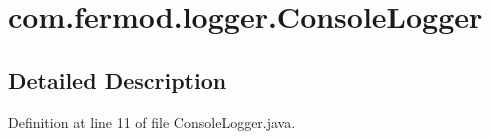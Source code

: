 \hypertarget{a00030}{}\section{com.\+fermod.\+logger.\+Console\+Logger}
\label{a00030}


\subsection{Detailed Description}


Definition at line 11 of file Console\+Logger.\+java.

